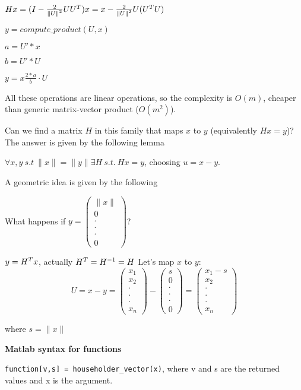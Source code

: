 \documentclass[computationalMathematics.tex]{subfiles}
\begin{document}
\begin{example}
$Hx = (I - \frac{2}{{\|U\|}^{2}} U {U}^{T})x = x - \frac{2}{{\|U\|}^{2}} U ({U}^{T} U)$

$y = compute\_product(U,x)$

$a = U' * x$

$b=U' * U$

$y = x \frac{2*a}{b} \cdot U$

All these operations are linear operations, so the complexity is $O(m)$, cheaper than generic matrix-vector product ($O(m^2)$).
\end{example}

Can we find a matrix $H$ in this family that maps $x$ to $y$ (equivalently $Hx = y$)? The answer is given by the following lemma

\begin{lemma}
 $\forall x, y ~ s.t ~ \|x\| = \|y\| \exists H ~ s.t. ~ Hx = y$, choosing $u = x - y$.
\end{lemma}

A geometric idea is given by the following


What happens if $y = \begin{pmatrix} \|x\|\\ 0\\ \cdot\\ \cdot\\ \cdot\\ 0\end{pmatrix}$?
  
  $y = {H}^{T}x$, actually ${H}^{T} = {H}^{-1} = H$
  Let's map $x$ to $y$: 
  \[
    U = x - y =
  \begin{pmatrix} {}x_{1}\\ {x}_{2}\\ \cdot\\ \cdot\\ \cdot\\{x}_{n}\end{pmatrix} - \begin{pmatrix} s\\ 0\\ \cdot\\ \cdot\\ \cdot\\ 0 \end{pmatrix} = 
    \begin{pmatrix} {x}_{1}-s\\ {x}_{2}\\ \cdot\\ \cdot\\ \cdot\\ {x}_{n} \end{pmatrix}
  \]
      
      where $s = \|x\|$

\textbf{Matlab syntax for functions}

{\tt function[v,s] = householder\_vector(x)}, where v and s are the returned values and x is the argument.
\end{document}
